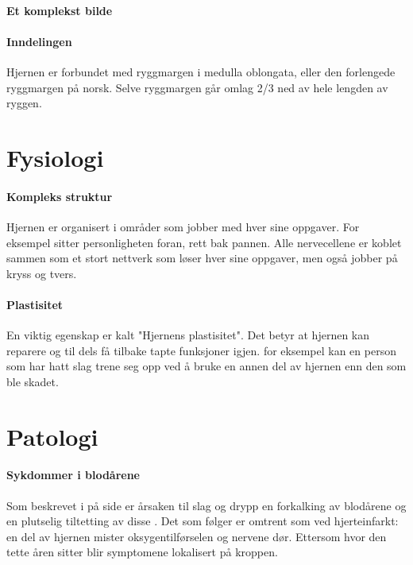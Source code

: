\documentclass[a4paper,12pt,twoside]{memoir}
\begin{document}
			\paragraph{Et komplekst bilde}
			\paragraph{Inndelingen\\}
				Hjernen er forbundet med ryggmargen i medulla oblongata, eller den forlengede ryggmargen på norsk. Selve ryggmargen går omlag 2/3 ned av hele lengden av ryggen. 
		\section{Fysiologi}
			\paragraph{Kompleks struktur\\}
				Hjernen er organisert i områder som jobber med hver sine oppgaver. For eksempel sitter personligheten foran, rett bak pannen. Alle nervecellene er koblet sammen som et stort nettverk som løser hver sine oppgaver, men også jobber på kryss og tvers. 
			\paragraph{Plastisitet\\}
				En viktig egenskap er kalt "Hjernens plastisitet". Det betyr at hjernen kan reparere og til dels få tilbake tapte funksjoner igjen. for eksempel kan en person som har hatt slag trene seg opp ved å bruke en annen del av hjernen enn den som ble skadet. 	
		\section{Patologi}
			\paragraph{Sykdommer i blodårene\\}
				Som beskrevet i  på side \pageref{sec:athero} %
				er årsaken til slag og drypp en forkalking av blodårene og en plutselig tiltetting av disse\cite{FA-athero}%
				. Det som følger er omtrent som ved hjerteinfarkt: en del av hjernen mister oksygentilførselen og nervene dør. Ettersom hvor den tette åren sitter blir symptomene lokalisert på kroppen.
\end{document}
